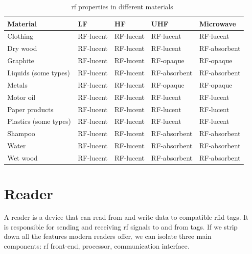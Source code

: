 
\begin{table}[!htb]
    \centering
    \caption{\ac{rf} properties in different materials~\cite{lahiriRFIDSourcebook2005}}
    \begin{tabular}{|l|l|l|l|l|}
    \hline
    \textbf{Material}     & \textbf{LF} & \textbf{HF} & \textbf{UHF} & \textbf{Microwave} \\ \hline
    Clothing              & RF-lucent   & RF-lucent   & RF-lucent    & RF-lucent          \\ \hline
    Dry wood              & RF-lucent   & RF-lucent   & RF-lucent    & RF-absorbent       \\ \hline
    Graphite              & RF-lucent   & RF-lucent   & RF-opaque    & RF-opaque          \\ \hline
    Liquids (some types)  & RF-lucent   & RF-lucent   & RF-absorbent & RF-absorbent       \\ \hline
    Metals                & RF-lucent   & RF-lucent   & RF-opaque    & RF-opaque          \\ \hline
    Motor oil             & RF-lucent   & RF-lucent   & RF-lucent    & RF-lucent          \\ \hline
    Paper products        & RF-lucent   & RF-lucent   & RF-lucent    & RF-lucent          \\ \hline
    Plastics (some types) & RF-lucent   & RF-lucent   & RF-lucent    & RF-lucent          \\ \hline
    Shampoo               & RF-lucent   & RF-lucent   & RF-absorbent & RF-absorbent       \\ \hline
    Water                 & RF-lucent   & RF-lucent   & RF-absorbent & RF-absorbent       \\ \hline
    Wet wood              & RF-lucent   & RF-lucent   & RF-absorbent & RF-absorbent       \\ \hline
    \end{tabular}
    \label{tab:rfproperties}
\end{table}

\section{Reader} \label{sec:reader}

A reader is a device that can read from and write data to compatible \ac{rfid} tags. It is responsible for sending and receiving \ac{rf} signals to and from tags.
If we strip down all the features modern readers offer, we can isolate three main components: \ac{rf} front-end, processor, communication interface. %

